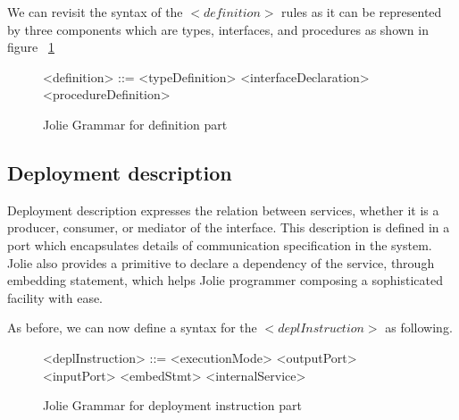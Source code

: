 





We can revisit the syntax of the \(<definition>\) rules as it can be represented by three components which are types, interfaces, and procedures as shown in figure ~\ref{fig:jolie-definition}

\begin{figure}[h]
    \begin{framed}
        \begin{grammar}
            <definition> ::= <typeDefinition>
            \alt <interfaceDeclaration>
            \alt <procedureDefinition>
        \end{grammar}
    \end{framed}
    \caption{Jolie Grammar for definition part}
    \label{fig:jolie-definition}
\end{figure}

\subsection{Deployment description}

Deployment description expresses the relation between services, whether it is a producer, consumer, or mediator of the interface.
This description is defined in a port which encapsulates details of communication specification in the system.
Jolie also provides a primitive to declare a dependency of the service, through embedding statement, which helps Jolie programmer composing a sophisticated facility with ease.








As before, we can now define a syntax for the \(<deplInstruction>\) as following.

\begin{figure}[h]
    \begin{framed}
        \begin{grammar}
            <deplInstruction> ::= <executionMode>
            \alt <outputPort>
            \alt <inputPort>
            \alt <embedStmt>
            \alt <internalService>
        \end{grammar}
    \end{framed}
    \caption{Jolie Grammar for deployment instruction part}
    \label{fig:jolie-depl}
\end{figure}


